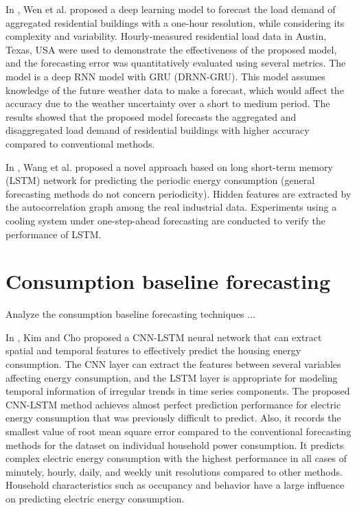 In \cite{WEN2020106073}, Wen et al. proposed a deep learning model to forecast the load demand of aggregated residential buildings with a one-hour resolution, while considering its complexity and variability.
Hourly-measured residential load data in Austin, Texas, USA were used to demonstrate the effectiveness of the proposed model, and the forecasting error was quantitatively evaluated using several metrics.
The model is a deep RNN model with GRU (DRNN-GRU).
This model assumes knowledge of the future weather data to make a forecast, which would affect the accuracy due to the weather uncertainty over a short to medium period.
The results showed that the proposed model forecasts the aggregated and disaggregated load demand of residential buildings with higher accuracy compared to conventional methods.

In \cite{WANG2020117197}, Wang et al. proposed a novel approach based on long short-term memory (LSTM) network for predicting the periodic energy consumption (general forecasting methods do not concern periodicity).
Hidden features are extracted by the autocorrelation graph among the real industrial data.
Experiments using a cooling system under one-step-ahead forecasting are conducted to verify the performance of LSTM.


\section{Consumption baseline forecasting}
\label{sec:baselinesoa}
\vspace{0.2 cm}

Analyze the consumption baseline forecasting techniques ...

In \cite{KIM201972}, Kim and Cho proposed a CNN-LSTM neural network that can extract spatial and temporal features to effectively predict the housing energy consumption.
The CNN layer can extract the features between several variables affecting energy consumption, and the LSTM layer is appropriate for modeling temporal information of irregular trends in time series components. The proposed CNN-LSTM method achieves almost perfect prediction performance for electric energy consumption that was previously difficult to predict.
Also, it records the smallest value of root mean square error compared to the conventional forecasting methods for the dataset on individual household power consumption.
It predicts complex electric energy consumption with the highest performance in all cases of minutely, hourly, daily, and weekly unit resolutions compared to other methods.
Household characteristics such as occupancy and behavior have a large influence on predicting electric energy consumption.

